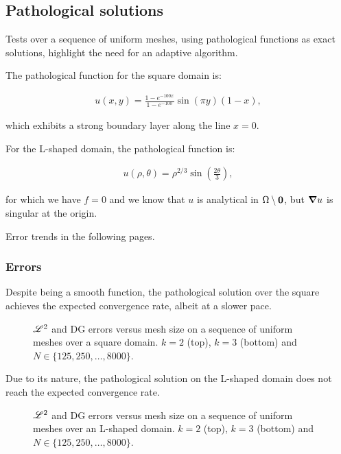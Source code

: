 \newpage
\subsection{Pathological solutions}

Tests over a sequence of uniform meshes, using pathological functions as exact solutions, highlight the need for an adaptive algorithm.

\cite{Antonietti2013} The pathological function for the square domain is:

\begin{gather} \label{pathological_square}
    u(x, y) = \frac{1 - e^{-100x}}{1 - e^{-100}} \sin(\pi y) (1 - x),
\end{gather}

which exhibits a strong boundary layer along the line $x = 0$.

For the L-shaped domain, the pathological function is:

\begin{gather} \label{pathological_lshape}
    u(\rho, \theta) = \rho^{2 / 3} \sin\left(\frac{2 \theta}{3}\right),
\end{gather}

for which we have $f = 0$ and we know that $u$ is analytical in $\Omega \setminus \bm{0}$, but $\bm{\nabla}{u}$ is singular at the origin.

Error trends in the following pages.

\newpage
\subsubsection{Errors}

Despite being a smooth function, the pathological solution over the square achieves the expected convergence rate, albeit at a slower pace.

\begin{figure}[!ht]
    
    
    \caption{$\mathscr{L}^2$ and DG errors versus mesh size on a sequence of uniform meshes over a square domain. $k = 2$ (top), $k = 3$ (bottom) and $N \in \{125, 250, \dots, 8000\}$.}
\end{figure}

\newpage

Due to its nature, the pathological solution on the L-shaped domain does not reach the expected convergence rate.

\begin{figure}[!ht]
    
    
    \caption{$\mathscr{L}^2$ and DG errors versus mesh size on a sequence of uniform meshes over an L-shaped domain. $k = 2$ (top), $k = 3$ (bottom) and $N \in \{125, 250, \dots, 8000\}$.}
\end{figure}